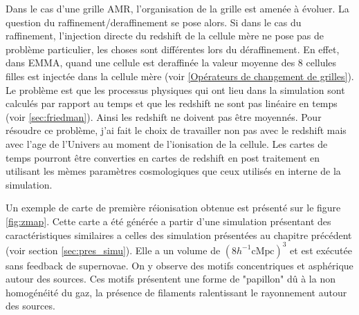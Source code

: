 Dans le cas d'une grille \ac{AMR}, l'organisation de la grille est amenée à évoluer.
La question du raffinement/deraffinement se pose alors.
Si dans le cas du raffinement, l'injection directe du redshift de la cellule mère ne pose pas de problème particulier, les choses sont différentes lors du déraffinement.
En effet, dans EMMA, quand une cellule est deraffinée la valeur moyenne des 8 cellules filles est injectée dans la cellule mère (voir \ref{Opérateurs de changement de grilles}).
Le problème est que les processus physiques qui ont lieu dans la simulation sont calculés par rapport au temps et que les redshift ne sont pas linéaire en temps (voir \ref{sec:friedman}).
Ainsi les redshift ne doivent pas être moyennés.
Pour résoudre ce problème, j'ai fait le choix de travailler non pas avec le redshift mais avec l'age de l'Univers au moment de l'ionisation de la cellule.
Les cartes de temps pourront être converties en cartes de redshift en post traitement en utilisant les mèmes paramètres cosmologiques que ceux utilisés en interne de la simulation.

Un exemple de carte de première réionisation obtenue est présenté sur le figure \ref{fig:zmap}.
Cette carte a été générée a partir d'une simulation présentant des caractéristiques similaires a celles des simulation présentées au chapitre précédent (voir section \ref{sec:pres_simu}).
Elle a un volume de $\left( 8h^{-1} \mathrm{cMpc} \right) ^3$ et est exécutée sans feedback de supernovae. 
On y observe des motifs concentriques et asphérique autour des sources. 
Ces motifs présentent une forme de "papillon" dû à la non homogénéité du gaz, la présence de filaments ralentissant le rayonnement autour des sources.

